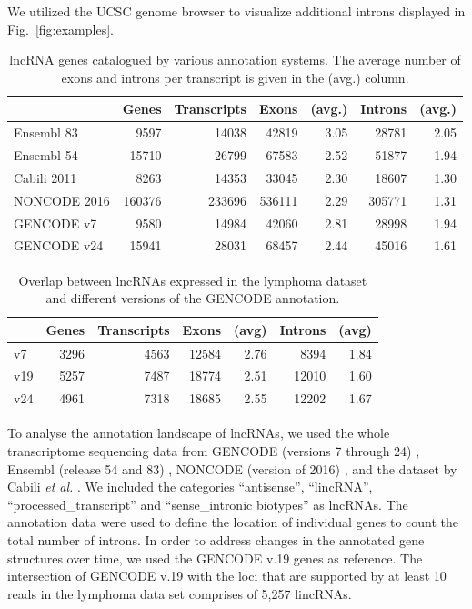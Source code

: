 \documentclass[ncrna,article,submit,moreauthors,pdftex,10pt,a4paper]{mdpi}
\begin{document}
We utilized the UCSC genome browser \cite{Kent:02} to visualize additional introns displayed in Fig.\ \ref{fig:examples}.

\begin{table}[ht]
  \caption{lncRNA genes catalogued by various annotation systems. The
    average number of exons and introns per transcript is given in the
    (avg.) column.} 
\label{tab:consortia}
\begin{center}\small
\begin{tabular}{|l|rr|rr|rr|}
  \hline
  & Genes & Transcripts & Exons & (avg.) & 
                        Introns & (avg.) \\ 
   \hline
  Ensembl 83   &   9597 &  14038 &  42819 & 3.05 &  28781 & 2.05 \\ 
  Ensembl 54   &  15710 &  26799 &  67583 & 2.52 &  51877 & 1.94 \\ 
  Cabili 2011  &   8263 &  14353 &  33045 & 2.30 &  18607 & 1.30 \\ 
  NONCODE 2016 & 160376 & 233696 & 536111 & 2.29 & 305771 & 1.31 \\ 
  GENCODE v7   &   9580 &  14984 &  42060 & 2.81 &  28998 & 1.94 \\ 
  GENCODE v24  &  15941 &  28031 &  68457 & 2.44 &  45016 & 1.61 \\ 
   \hline
\end{tabular}
\end{center}
\end{table}

\begin{table}[ht]
  \caption{Overlap between lncRNAs expressed in the lymphoma dataset 
    and different versions of the GENCODE annotation.} 
\label{tab:gencode}
\begin{center}\small
\begin{tabular}{|l|rr|rr|rr|}
  \hline
  & Genes & Transcripts & Exons & (avg) & Introns & (avg) \\ 
   \hline
  v7  & 3296 & 4563 & 12584 & 2.76 &  8394 & 1.84 \\
  v19 & 5257 & 7487 & 18774 & 2.51 & 12010 & 1.60 \\
  v24 & 4961 & 7318 & 18685 & 2.55 & 12202 & 1.67 \\ 
   \hline
\end{tabular}
\end{center}
\end{table}

To analyse the annotation landscape of lncRNAs, we used the whole
transcriptome sequencing data from GENCODE (versions 7 through 24)
\cite{harrow2012}, Ensembl (release 54 and 83) \cite{flicek2014}, NONCODE
(version of 2016) \cite{zhao2016}, and the dataset by Cabili \textit{et
  al.}  \cite{cabili2011}. We included the categories ``antisense'',
``lincRNA'', ``processed\_transcript'' and ``sense\_intronic biotypes'' as
lncRNAs.  The annotation data were used to define the location of
individual genes to count the total number of introns. In order to address
changes in the annotated gene structures over time, we used the GENCODE v.19
genes as reference. The intersection of GENCODE v.19 with the loci that are
supported by at least 10 reads in the lymphoma data set comprises of 5,257
lincRNAs.
\end{document}
